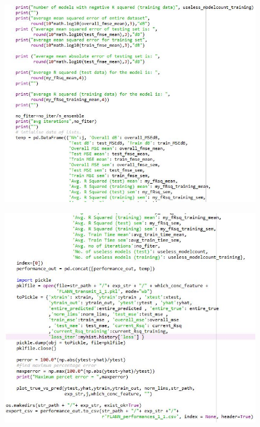 \documentclass[]{article}
\begin{document}
\begin{figure}
\centering
\includegraphics[width=1\textwidth,height=\textheight]{images/flann7.jpg}
\end{figure}

\begin{figure}
\centering
\includegraphics[width=1\textwidth,height=\textheight]{images/flann8.jpg}
\end{figure}
\end{document}
